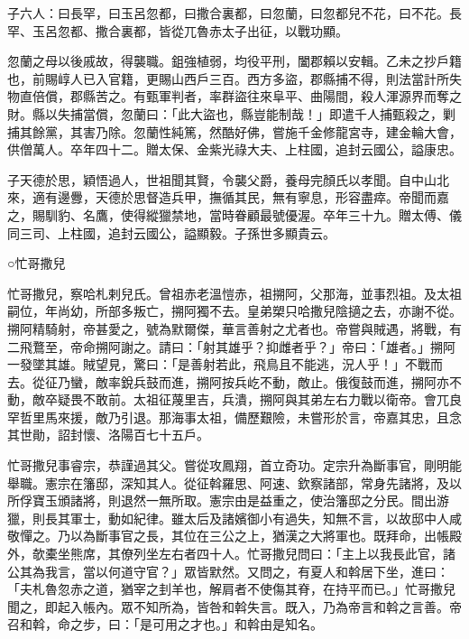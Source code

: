 \begin{pinyinscope}
 子六人：曰長罕，曰玉呂忽都，曰撒合裏都，曰忽蘭，曰忽都兒不花，曰不花。長罕、玉呂忽都、撒合裏都，皆從兀魯赤太子出征，以戰功顯。



 忽蘭之母以後戚故，得襲職。鉏強植弱，均役平刑，闔郡賴以安輯。乙未之抄戶籍也，前賜崞人已入官籍，更賜山西戶三百。西方多盜，郡縣捕不得，則法當計所失物直倍償，郡縣苦之。有甄軍判者，率群盜往來阜平、曲陽間，殺人渾源界而奪之財。縣以失捕當償，忽蘭曰：「此大盜也，縣豈能制哉！」即遣千人捕甄殺之，剿捕其餘黨，其害乃除。忽蘭性純篤，然酷好佛，嘗施千金修龍宮寺，建金輪大會，供僧萬人。卒年四十二。贈太保、金紫光祿大夫、上柱國，追封云國公，謚康忠。



 子天德於思，穎悟過人，世祖聞其賢，令襲父爵，養母完顏氏以孝聞。自中山北來，適有邊釁，天德於思督造兵甲，撫循其民，無有寧息，形容盡瘁。帝聞而嘉之，賜馴豹、名鷹，使得縱獵禁地，當時眷顧最號優渥。卒年三十九。贈太傅、儀同三司、上柱國，追封云國公，謚顯毅。子孫世多顯貴云。



 ○忙哥撒兒



 忙哥撒兒，察哈札剌兒氏。曾祖赤老溫愷赤，祖搠阿，父那海，並事烈祖。及太祖嗣位，年尚幼，所部多叛亡，搠阿獨不去。皇弟槊只哈撒兒陰擿之去，亦謝不從。搠阿精騎射，帝甚愛之，號為默爾傑，華言善射之尤者也。帝嘗與賊遇，將戰，有二飛鶩至，帝命搠阿謝之。請曰：「射其雄乎？抑雌者乎？」帝曰：「雄者。」搠阿一發墜其雄。賊望見，驚曰：「是善射若此，飛鳥且不能逃，況人乎！」不戰而去。從征乃蠻，敵率銳兵鼓而進，搠阿按兵屹不動，敵止。俄復鼓而進，搠阿亦不動，敵卒疑畏不敢前。太祖征蔑里吉，兵潰，搠阿與其弟左右力戰以衛帝。會兀良罕哲里馬來援，敵乃引退。那海事太祖，備歷艱險，未嘗形於言，帝嘉其忠，且念其世勛，詔封懷、洛陽百七十五戶。



 忙哥撒兒事睿宗，恭謹過其父。嘗從攻鳳翔，首立奇功。定宗升為斷事官，剛明能舉職。憲宗在籓邸，深知其人。從征斡羅思、阿速、欽察諸部，常身先諸將，及以所俘寶玉頒諸將，則退然一無所取。憲宗由是益重之，使治籓邸之分民。間出游獵，則長其軍士，動如紀律。雖太后及諸嬪御小有過失，知無不言，以故邸中人咸敬憚之。乃以為斷事官之長，其位在三公之上，猶漢之大將軍也。既拜命，出帳殿外，欹橐坐熊席，其僚列坐左右者四十人。忙哥撒兒問曰：「主上以我長此官，諸公其為我言，當以何道守官？」眾皆默然。又問之，有夏人和斡居下坐，進曰：「夫札魯忽赤之道，猶宰之刲羊也，解肩者不使傷其脊，在持平而已。」忙哥撒兒聞之，即起入帳內。眾不知所為，皆咎和斡失言。既入，乃為帝言和斡之言善。帝召和斡，命之步，曰：「是可用之才也。」和斡由是知名。




\end{pinyinscope}
